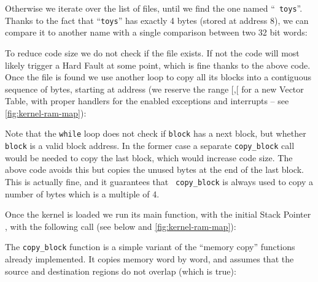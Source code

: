 
Otherwise we iterate over the list of files, until we find the one named ``{\tt
toys}''. Thanks to the fact that ``{\tt toys}'' has exactly 4 bytes (stored at
address 8), we can compare it to another name with a single comparison between
two 32 bit words:



To reduce code size we do not check if the file exists. If not the code will
most likely trigger a Hard Fault at some point, which is fine thanks to the
above code. Once the file is found we use another loop to copy all its blocks
into a contiguous sequence of bytes, starting at address
 (we reserve the range
[,[ for a new Vector Table, with proper handlers
for the enabled exceptions and interrupts -- see \cref{fig:kernel-ram-map}):


Note that the {\tt while} loop does not check if {\tt block} has a next block,
but whether {\tt block} is a valid block address. In the former case a separate
{\tt copy\_block} call would be needed to copy the last block, which would
increase code size. The above code avoids this but copies the unused bytes at
the end of the last block. This is actually fine, and it guarantees that {\tt
copy\_block} is always used to copy a number of bytes which is a multiple of 4.

Once the kernel is loaded we run its main function, with the initial Stack
Pointer , with the following call (see below and
\cref{fig:kernel-ram-map}):


The {\tt copy\_block} function is a simple variant of the ``memory
copy'' functions already implemented. It copies memory word by word, and
assumes that the source and destination regions do not overlap (which is true):

